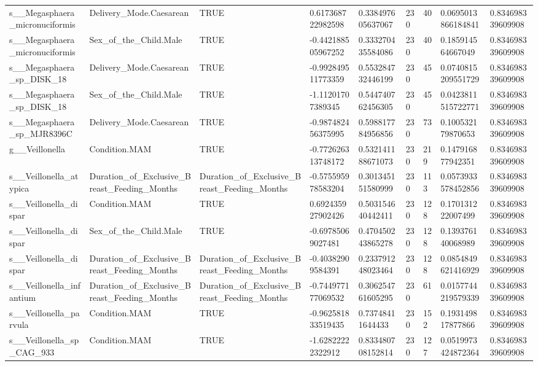 \begin{longtable}{lllllllll}
s\_\_Megasphaera\_micronuciformis & Delivery\_Mode.Caesarean & TRUE & 0.617368722982598 & 0.338497605637067 & 230 & 40 & 0.0695013866184841 & 0.834698339609908 \\
s\_\_Megasphaera\_micronuciformis & Sex\_of\_the\_Child.Male & TRUE & -0.442188505967252 & 0.333270435584086 & 230 & 40 & 0.185914564667049 & 0.834698339609908 \\
s\_\_Megasphaera\_sp\_DISK\_18 & Delivery\_Mode.Caesarean & TRUE & -0.992849511773359 & 0.553284732446199 & 230 & 45 & 0.0740815209551729 & 0.834698339609908 \\
s\_\_Megasphaera\_sp\_DISK\_18 & Sex\_of\_the\_Child.Male & TRUE & -1.11201707389345 & 0.544740762456305 & 230 & 45 & 0.0423811515722771 & 0.834698339609908 \\
s\_\_Megasphaera\_sp\_MJR8396C & Delivery\_Mode.Caesarean & TRUE & -0.987482456375995 & 0.598817784956856 & 230 & 73 & 0.100532179870653 & 0.834698339609908 \\
g\_\_Veillonella & Condition.MAM & TRUE & -0.772626313748172 & 0.532141188671073 & 230 & 219 & 0.147916877942351 & 0.834698339609908 \\
s\_\_Veillonella\_atypica & Duration\_of\_Exclusive\_Breast\_Feeding\_Months & Duration\_of\_Exclusive\_Breast\_Feeding\_Months & -0.575595978583204 & 0.301345151580999 & 230 & 113 & 0.0573933578452856 & 0.834698339609908 \\
s\_\_Veillonella\_dispar & Condition.MAM & TRUE & 0.692435927902426 & 0.503154640442411 & 230 & 128 & 0.170131222007499 & 0.834698339609908 \\
s\_\_Veillonella\_dispar & Sex\_of\_the\_Child.Male & TRUE & -0.69785069027481 & 0.470450243865278 & 230 & 128 & 0.139376140068989 & 0.834698339609908 \\
s\_\_Veillonella\_dispar & Duration\_of\_Exclusive\_Breast\_Feeding\_Months & Duration\_of\_Exclusive\_Breast\_Feeding\_Months & -0.40382909584391 & 0.233791248023464 & 230 & 128 & 0.0854849621416929 & 0.834698339609908 \\
s\_\_Veillonella\_infantium & Duration\_of\_Exclusive\_Breast\_Feeding\_Months & Duration\_of\_Exclusive\_Breast\_Feeding\_Months & -0.744977177069532 & 0.306254761605295 & 230 & 61 & 0.0157744219579339 & 0.834698339609908 \\
s\_\_Veillonella\_parvula & Condition.MAM & TRUE & -0.962581833519435 & 0.73748411644433 & 230 & 152 & 0.193149817877866 & 0.834698339609908 \\
s\_\_Veillonella\_sp\_CAG\_933 & Condition.MAM & TRUE & -1.62822222322912 & 0.833480708152814 & 230 & 127 & 0.0519973424872364 & 0.834698339609908 \\

\end{longtable}
